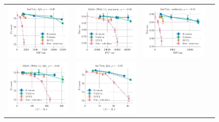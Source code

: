 \begin{figure}
\begin{tabular}{@{\hskip -0.0in}c@{\hskip -0.0in}c@{\hskip -0.0in}c@{\hskip -0.0in}c@{\hskip -0.0in}}
		\includegraphics[width=.245\linewidth]{figures/fasttext1m_qa_best-f1_vs_gram-large-dim-frob-error_linx_stoc.pdf} &
		\includegraphics[width=.245\linewidth]{figures/glove400k_sentiment_sst_test-acc_vs_gram-large-dim-frob-error_linx_stoc.pdf} &
		\includegraphics[width=.245\linewidth]{figures/fasttext1m_sentiment_sst_test-acc_vs_gram-large-dim-frob-error_linx_stoc.pdf} \\
		\includegraphics[width=.245\linewidth]{figures/glove400k_qa_best-f1_vs_gram-large-dim-delta1-2-trans_linx_stoc.pdf} &
		\includegraphics[width=.245\linewidth]{figures/fasttext1m_qa_best-f1_vs_gram-large-dim-delta1-2-trans_linx_stoc.pdf} &

\end{tabular}
\end{figure}
